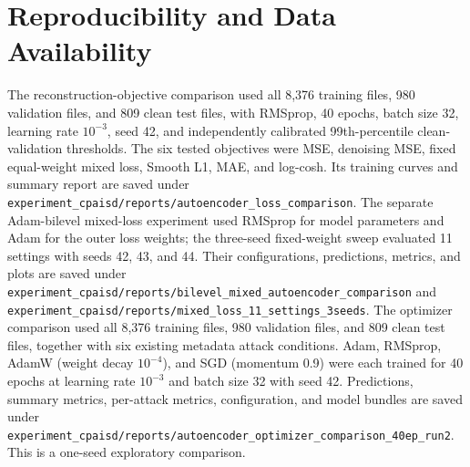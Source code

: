 \documentclass[journal]{IEEEtran}
\begin{document}
  \section*{Reproducibility and Data Availability}
  The reconstruction-objective comparison used all 8,376 training files, 980 validation files, and 809 clean test files, with RMSprop, 40 epochs, batch size 32, learning rate $10^{-3}$, seed 42, and independently calibrated 99th-percentile clean-validation thresholds. The six tested objectives were MSE, denoising MSE, fixed equal-weight mixed loss, Smooth L1, MAE, and log-cosh. Its training curves and summary report are saved under \texttt{experiment\_cpaisd/reports/autoencoder\_loss\_comparison}. The separate Adam-bilevel mixed-loss experiment used RMSprop for model parameters and Adam for the outer loss weights; the three-seed fixed-weight sweep evaluated 11 settings with seeds 42, 43, and 44. Their configurations, predictions, metrics, and plots are saved under \texttt{experiment\_cpaisd/reports/bilevel\_mixed\_autoencoder\_comparison} and \texttt{experiment\_cpaisd/reports/mixed\_loss\_11\_settings\_3seeds}. The optimizer comparison used all 8,376 training files, 980 validation files, and 809 clean test files, together with six existing metadata attack conditions. Adam, RMSprop, AdamW (weight decay $10^{-4}$), and SGD (momentum 0.9) were each trained for 40 epochs at learning rate $10^{-3}$ and batch size 32 with seed 42. Predictions, summary metrics, per-attack metrics, configuration, and model bundles are saved under \texttt{experiment\_cpaisd/reports/autoencoder\_optimizer\_comparison\_40ep\_run2}. This is a one-seed exploratory comparison.
  
\end{document}
